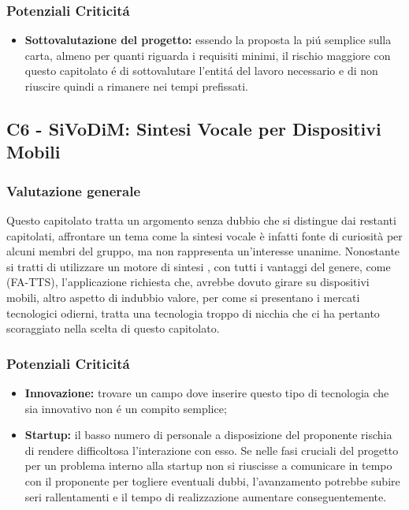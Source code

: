 \subsubsection{Potenziali Criticit\'a}

\begin{itemize}
	\item \textbf{Sottovalutazione del progetto:} essendo la proposta la pi\'u semplice sulla carta, almeno per quanti riguarda i requisiti minimi, il rischio maggiore con questo capitolato \'e di sottovalutare l'entit\'a del lavoro necessario e di non riuscire quindi a rimanere nei tempi prefissati.
\end{itemize}


\subsection{C6 - SiVoDiM: Sintesi Vocale per Dispositivi Mobili}
\subsubsection{Valutazione generale}
Questo capitolato tratta un argomento senza dubbio che si distingue dai restanti capitolati, affrontare un tema come la sintesi vocale \`e infatti fonte di curiosit\`a per alcuni membri del gruppo, ma non rappresenta un'interesse unanime.
Nonostante si tratti di utilizzare un motore di sintesi , con tutti i vantaggi del genere, come  (FA-TTS), l'applicazione richiesta che, avrebbe dovuto girare su dispositivi mobili, altro aspetto di indubbio valore, per come si presentano i mercati tecnologici odierni, tratta una tecnologia troppo di nicchia che ci ha pertanto scoraggiato nella scelta di questo capitolato.

\subsubsection{Potenziali Criticit\'a}

\begin{itemize}
	\item \textbf{Innovazione:} trovare un campo dove inserire questo tipo di tecnologia che sia innovativo non \'e un compito semplice;
\end{itemize}

\begin{itemize}
	\item \textbf{Startup:} il basso numero di personale a disposizione del proponente rischia di rendere difficoltosa l'interazione con esso. Se nelle fasi cruciali del progetto per un problema interno alla startup non si riuscisse a comunicare in tempo con il proponente per togliere eventuali dubbi, l'avanzamento potrebbe subire seri rallentamenti e il tempo di realizzazione aumentare conseguentemente.
\end{itemize}
